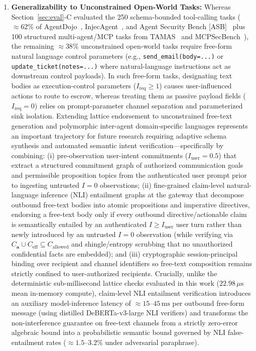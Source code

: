 \documentclass[conference,10pt]{IEEEtran}
\begin{document}
\begin{enumerate}
    \item \textbf{Generalizability to Unconstrained Open-World Tasks:} Whereas Section~\ref{sec:eval}-C evaluated the 250 schema-bounded tool-calling tasks ($\approx 62\%$ of AgentDojo~\cite{agentdojo2024}, InjecAgent~\cite{injecagent2024}, and Agent Security Bench [ASB]~\cite{zhang2025asb} plus 100 structured multi-agent/MCP tasks from TAMAS~\cite{kavathekar2025tamas} and MCPSecBench~\cite{yang2025mcpsecbench}), the remaining $\approx 38\%$ unconstrained open-world tasks require free-form natural language control parameters (e.g., \texttt{send\_email(body=...)} or \texttt{update\_ticket(notes=...)} where natural-language instructions act as downstream control payloads). In such free-form tasks, designating text bodies as execution-control parameters ($I_{\text{req}} \ge 1$) causes user-influenced actions to route to escrow, whereas treating them as passive payload fields ($I_{\text{req}} = 0$) relies on prompt-parameter channel separation and parameterized sink isolation. Extending lattice endorsement to unconstrained free-text generation and polymorphic inter-agent domain-specific languages represents an important trajectory for future research requiring adaptive schema synthesis and automated semantic intent verification---specifically by combining: (i) pre-observation user-intent commitments ($I_{\text{user}} = 0.5$) that extract a structured commitment graph of authorized communication goals and permissible proposition topics from the authenticated user prompt prior to ingesting untrusted $I = 0$ observations; (ii) fine-grained claim-level natural-language inference (NLI) entailment graphs at the gateway that decompose outbound free-text bodies into atomic propositions and imperative directives, endorsing a free-text body only if every outbound directive/actionable claim is semantically entailed by an authenticated $I \ge I_{\text{user}}$ user turn rather than newly introduced by an untrusted $I = 0$ observation (while verifying via $C_{\mathbf{a}} \cup C_{\text{eff}} \subseteq C_{\text{allowed}}$ and shingle/entropy scrubbing that no unauthorized confidential facts are embedded); and (iii) cryptographic session-principal binding over recipient and channel identifiers so free-text composition remains strictly confined to user-authorized recipients. Crucially, unlike the deterministic sub-millisecond lattice checks evaluated in this work ($22.98\,\mu\text{s}$ mean in-memory compute), claim-level NLI entailment verification introduces an auxiliary model-inference latency of $\approx 15\text{--}45\,\text{ms}$ per outbound free-form message (using distilled DeBERTa-v3-large NLI verifiers) and transforms the non-interference guarantee on free-text channels from a strictly zero-error algebraic bound into a probabilistic semantic bound governed by NLI false-entailment rates ($\approx 1.5\text{--}3.2\%$ under adversarial paraphrase).
\end{enumerate}
\end{document}
